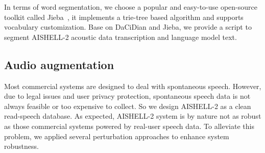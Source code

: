 \documentclass[a4paper]{article}
\begin{document}
In terms of word segmentation, we choose a popular and easy-to-use open-source
toolkit called Jieba~\cite{jieba}, it implements a trie-tree based algorithm and
supports vocabulary customization.  Base on DaCiDian and Jieba, we provide a
script to segment AISHELL-2 acoustic data transcription and language model text.

\subsection{Audio augmentation}

Most commercial systems are designed to deal with spontaneous speech. However,
due to legal issues and user privacy protection, spontaneous speech data is not
always feasible or too expensive to collect. So we design AISHELL-2 as a clean
read-speech database. As expected, AISHELL-2 system is by nature not as robust
as those commercial systems powered by real-user speech data. To alleviate this
problem, we applied several perturbation approaches to enhance system
robustness.
\end{document}
